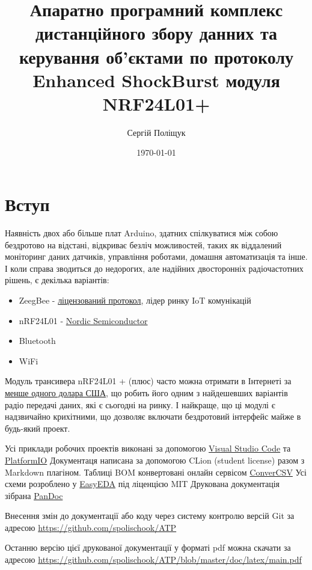 \documentclass[14pt,a4paper]{extarticle}
\title{Апаратно програмний комплекс дистанційного збору данних та керування об'єктами по протоколу Enhanced ShockBurst модуля NRF24L01+}
\author{Сергій Поліщук}
\date{\today}
\begin{document}
\maketitle
\tableofcontents
\clearpage
\section{Вступ}
Наявність двох або більше плат Arduino, здатних спілкуватися між собою
бездротово на відстані, відкриває безліч можливостей, таких як
віддалений моніторинг даних датчиків, управління роботами, домашня
автоматизація та інше. І коли справа зводиться до недорогих, але
надійних двосторонніх радіочастотних рішень, є декілька варіантів:
\begin{itemize}
\item ZeegBee -
\href{https://web.archive.org/web/20100216234546/http://freaklabs.org/index.php/Blog/Zigbee/Zigbee-Linux-and-the-GPL.html}{ліцензований
протокол}, лідер ринку IoT комунікацій
\item nRF24L01 -
\href{https://www.nordicsemi.com/Products/Low-power-short-range-wireless/nRF24-series}{Nordic
Semiconductor}
\item Bluetooth
\item WiFi
\end{itemize}

Модуль трансивера nRF24L01 + (плюс) часто можна отримати в Інтернеті за
\href{https://ru.aliexpress.com/wholesale?SearchText=nrf24l01}{менше
одного долара США}, що робить його одним з найдешевших варіантів радіо
передачі даних, які є сьогодні на ринку. І найкраще, що ці модулі є
надзвичайно крихітними, що дозволяє включати бездротовий інтерфейс майже
в будь-який проект.

Усі приклади робочих проектів виконані за допомогою
\href{https://code.visualstudio.com/}{Visual Studio Code}
та \href{https://platformio.org/}{PlatformIO}  
Документаця написана за допомогою CLion (student license)
разом з Markdown плагіном.  
Таблиці BOM конвертовані онлайн сервісом \href{https://www.convertcsv.com/csv-to-markdown.htm}{ConverCSV}  
Усі схеми розроблено у \href{https://easyeda.com/}{EasyEDA} під ліценцією MIT  
Друкована документація зібрана \href{https://pandoc.org/}{PanDoc}

Внесення змін до документації або коду через систему контролю
версій Git за адресою
\href{https://github.com/spolischook/ATP}{https://github.com/spolischook/ATP}

Останню версію цієї друкованої документації у форматі pdf можна скачати за адресою 
\href{https://github.com/spolischook/ATP/blob/master/doc/latex/main.pdf}{https://github.com/spolischook/ATP/blob/master/doc/latex/main.pdf}
\end{document}

